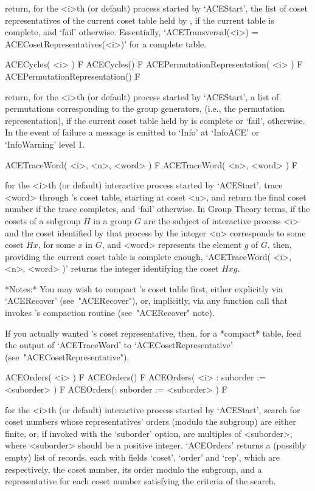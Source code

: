 return, for the <i>th (or default) process started by `ACEStart',  the
list of coset representatives of  the  current  coset  table  held  by
{\ACE}, if the  current  table  is  complete,  and  `fail'  otherwise.
Essentially, `ACETransversal(<i>) = ACECosetRepresentatives(<i>)'  for
a complete table.

\>ACECycles( <i> ) F
\>ACECycles() F
\>ACEPermutationRepresentation( <i> ) F
\>ACEPermutationRepresentation() F

return, for the <i>th (or default) process started  by  `ACEStart',  a
list of permutations corresponding to the group generators, (i.e., the
permutation representation), if the current coset table held by {\ACE}
is complete or `fail', otherwise. In the event of failure a message is
emitted to `Info' at `InfoACE' or `InfoWarning' level 1.

\>ACETraceWord( <i>, <n>, <word> ) F
\>ACETraceWord( <n>, <word> ) F

for the <i>th (or  default)  interactive  {\ACE}  process  started  by
`ACEStart', trace <word> through {\ACE}'s  coset  table,  starting  at
coset <n>, and return the final coset number if the  trace  completes,
and `fail' otherwise. In Group  Theory  terms,  if  the  cosets  of  a
subgroup $H$ in a group $G$ are  the  subject  of  interactive  {\ACE}
process <i> and the coset identified by that process  by  the  integer
<n> corresponds to some coset $Hx$, for some $x$ in  $G$,  and  <word>
represents the element $g$ of $G$, then, providing the  current  coset
table is complete enough, `ACETraceWord( <i>, <n>, <word>  )'  returns
the integer identifying the coset $Hxg$.

*Notes:*
You may wish to compact {\ACE}'s coset table first, either  explicitly
via `ACERecover' (see~"ACERecover"), or, implicitly, via any  function
call that invokes {\ACE}'s compaction routine (see~"ACERecover" note).

If you actually wanted {\ACE}'s  coset  representative,  then,  for  a
*compact*   table,   feed   the   output    of    `ACETraceWord'    to
`ACECosetRepresentative' (see~"ACECosetRepresentative").

\>ACEOrders( <i> ) F
\>ACEOrders() F
\>ACEOrders( <i> : suborder := <suborder> ) F
\>ACEOrders(: suborder := <suborder> ) F

for the <i>th (or  default)  interactive  {\ACE}  process  started  by
`ACEStart', search for coset  numbers  whose  representatives'  orders
(modulo the subgroup) are either  finite,  or,  if  invoked  with  the
`suborder' option,  are  multiples  of  <suborder>,  where  <suborder>
should be a positive integer. `ACEOrders' returns a  (possibly  empty)
list of records, each with fields `coset', `order'  and  `rep',  which
are respectively, the coset number, its order modulo the subgroup, and
a representative for each coset number satisfying the criteria of  the
search. 

